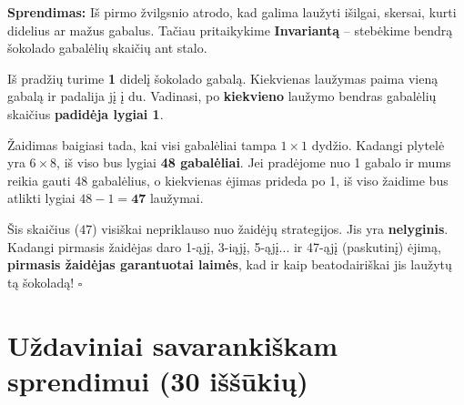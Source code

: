 \documentclass[11pt,a4paper]{scrartcl}
\newenvironment{solution}
    {\begin{list}{}{\setlength{\leftmargin}{10pt}\setlength{\rightmargin}{10pt}}\item[]}
    {\end{list}}
\begin{document}
\begin{solution}
\textbf{Sprendimas:}
Iš pirmo žvilgsnio atrodo, kad galima laužyti išilgai, skersai, kurti didelius ar mažus gabalus. Tačiau pritaikykime \textbf{Invariantą} – stebėkime bendrą šokolado gabalėlių skaičių ant stalo.

Iš pradžių turime \textbf{1} didelį šokolado gabalą.
Kiekvienas laužymas paima vieną gabalą ir padalija jį į du. Vadinasi, po \textbf{kiekvieno} laužymo bendras gabalėlių skaičius \textbf{padidėja lygiai 1}.

Žaidimas baigiasi tada, kai visi gabalėliai tampa $1 \times 1$ dydžio. Kadangi plytelė yra $6 \times 8$, iš viso bus lygiai \textbf{48 gabalėliai}.
Jei pradėjome nuo 1 gabalo ir mums reikia gauti 48 gabalėlius, o kiekvienas ėjimas prideda po 1, iš viso žaidime bus atlikti lygiai $48 - 1 = \textbf{47}$ laužymai.

Šis skaičius ($47$) visiškai nepriklauso nuo žaidėjų strategijos. Jis yra \textbf{nelyginis}. 
Kadangi pirmasis žaidėjas daro 1-ąjį, 3-iąjį, 5-ąjį... ir 47-ąjį (paskutinį) ėjimą, \textbf{pirmasis žaidėjas garantuotai laimės}, kad ir kaip beatodairiškai jis laužytų tą šokoladą! \hfill $\square$
\end{solution}

\newpage
\section{Uždaviniai savarankiškam sprendimui (30 iššūkių)}
\end{document}

